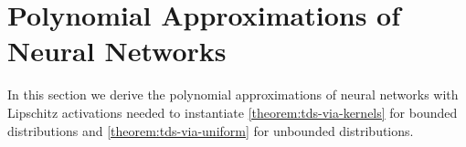 


\section{Polynomial Approximations of Neural Networks}\label{section:approximation_theory}
In this section we derive the polynomial approximations of neural networks with Lipschitz activations needed to instantiate \cref{theorem:tds-via-kernels} for bounded distributions and \cref{theorem:tds-via-uniform} for unbounded distributions. 

